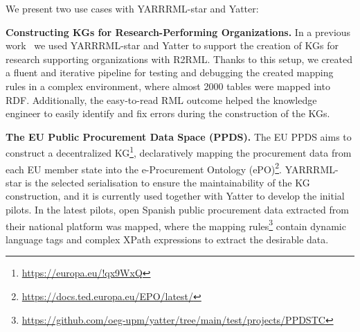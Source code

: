 We present two use cases with YARRRML-star and Yatter:%

\noindent\textbf{Constructing KGs for Research-Performing Organizations.} In a previous work~\citep{chaves2022systematic} we used YARRRML-star and Yatter to support the creation of KGs for research supporting organizations with R2RML. 
Thanks to this setup, we created a fluent and iterative pipeline for testing and debugging the created mapping rules in a complex environment, where almost 2000 tables were mapped into RDF. 
Additionally, the easy-to-read RML outcome helped the knowledge engineer to easily identify and fix errors during the construction of the KGs.  

\noindent\textbf{The EU Public Procurement Data Space (PPDS).} The EU PPDS aims to construct a decentralized KG\footnote{\url{https://europa.eu/!qx9WxQ}}, declaratively mapping the procurement data from each EU member state into the e-Procurement Ontology (ePO)\footnote{\url{https://docs.ted.europa.eu/EPO/latest/}}. 
YARRRML-star is the selected serialisation to ensure the maintainability of the KG construction, and it is currently used together with Yatter to develop the initial pilots. 
In the latest pilots, open Spanish public procurement data extracted from their national platform was mapped, where the mapping rules\footnote{\url{https://github.com/oeg-upm/yatter/tree/main/test/projects/PPDSTC}} contain dynamic language tags and complex XPath expressions to extract the desirable data.
